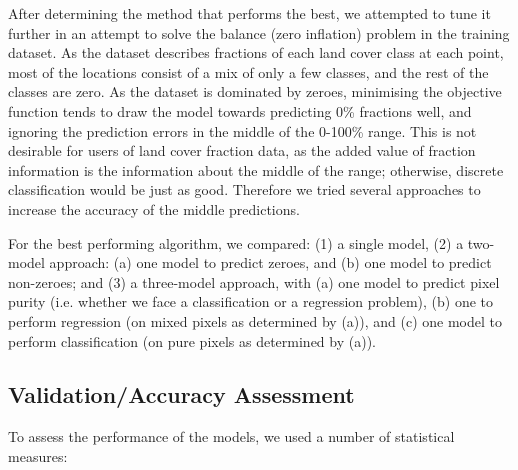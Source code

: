 \documentclass[review,authoryear,3p]{elsarticle}
\begin{document}
After determining the method that performs the best, we attempted to tune it further in an attempt to solve the balance (zero inflation) problem in the training dataset.
As the dataset describes fractions of each land cover class at each point, most of the locations consist of a mix of only a few classes, and the rest of the classes are zero.
As the dataset is dominated by zeroes, minimising the objective function tends to draw the model towards predicting 0\% fractions well, and ignoring the prediction errors in the middle of the 0-100\% range.
This is not desirable for users of land cover fraction data, as the added value of fraction information is the information about the middle of the range; otherwise, discrete classification would be just as good.
Therefore we tried several approaches to increase the accuracy of the middle predictions.

For the best performing algorithm, we compared: (1) a single model, (2) a two-model approach: (a) one model to predict zeroes, and (b) one model to predict non-zeroes; and (3) a three-model approach, with (a) one model to predict pixel purity (i.e. whether we face a classification or a regression problem), (b) one to perform regression (on mixed pixels as determined by (a)), and (c) one model to perform classification (on pure pixels as determined by (a)).


\subsection{Validation/Accuracy Assessment}

To assess the performance of the models, we used a number of statistical measures:
\end{document}
